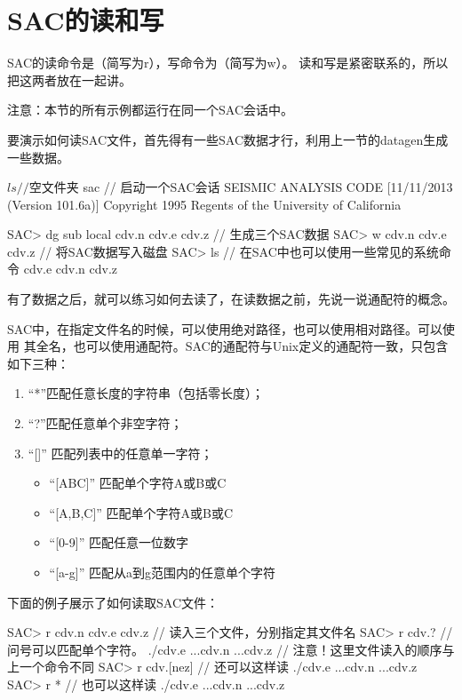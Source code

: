 \section{SAC的读和写}
SAC的读命令是（简写为r），写命令为（简写为w）。
读和写是紧密联系的，所以把这两者放在一起讲。

注意：本节的所有示例都运行在同一个SAC会话中。

要演示如何读SAC文件，首先得有一些SAC数据才行，利用上一节的datagen生成一些数据。
\begin{SACCode}
$ ls                // 空文件夹
$ sac               // 启动一个SAC会话
 SEISMIC ANALYSIS CODE [11/11/2013 (Version 101.6a)]
 Copyright 1995 Regents of the University of California

SAC> dg sub local cdv.n cdv.e cdv.z     // 生成三个SAC数据
SAC> w cdv.n cdv.e cdv.z                // 将SAC数据写入磁盘
SAC> ls                                 // 在SAC中也可以使用一些常见的系统命令
cdv.e  cdv.n  cdv.z
\end{SACCode}

有了数据之后，就可以练习如何去读了，在读数据之前，先说一说通配符的概念。

SAC中，在指定文件名的时候，可以使用绝对路径，也可以使用相对路径。可以使用
其全名，也可以使用通配符。SAC的通配符与Unix定义的通配符一致，只包含如下三种：
\begin{enumerate}
\item ``*''匹配任意长度的字符串（包括零长度）；
\item ``?''匹配任意单个非空字符；
\item ``[]'' 匹配列表中的任意单一字符；
    \begin{itemize}
    \item ``[ABC]'' 匹配单个字符A或B或C
    \item ``[A,B,C]'' 匹配单个字符A或B或C
    \item ``[0-9]'' 匹配任意一位数字
    \item ``[a-g]'' 匹配从a到g范围内的任意单个字符
    \end{itemize}
\end{enumerate}

下面的例子展示了如何读取SAC文件：
\begin{SACCode}
SAC> r cdv.n cdv.e cdv.z    // 读入三个文件，分别指定其文件名
SAC> r cdv.?                // 问号可以匹配单个字符。
./cdv.e ...cdv.n ...cdv.z   // 注意！这里文件读入的顺序与上一个命令不同
SAC> r cdv.[nez]            // 还可以这样读
./cdv.e ...cdv.n ...cdv.z
SAC> r *                    // 也可以这样读
./cdv.e ...cdv.n ...cdv.z
\end{SACCode}


